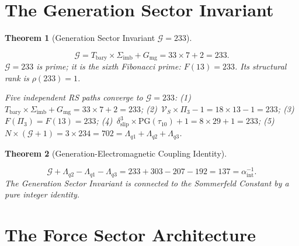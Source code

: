 \documentclass[11pt,letterpaper]{article}
\theoremstyle{plain}
\newtheorem{theorem}{Theorem}[section]
\theoremstyle{definition}
\theoremstyle{remark}
\newcommand{\rank}{\rho}
\newcommand{\Tbary}{T_{\mathrm{bary}}}
\newcommand{\Sigimb}{\Sigma_{\mathrm{imb}}}
\newcommand{\VS}{\mathcal{V}_S}
\newcommand{\PG}{\mathrm{PG}}
\newcommand{\Gmg}{G_{\mathrm{mg}}}
\newcommand{\dslip}{\delta_{\mathrm{slip}}}
\newcommand{\tauX}{\tau_{10}}
\newcommand{\Pithree}{\Pi_3}
\newcommand{\aSC}{\alpha^{-1}_{\mathrm{int}}}
\newcommand{\FibN}[1]{F(#1)}
\begin{document}
\section{The Generation Sector Invariant}\label{sec:gsi}

\begin{theorem}[Generation Sector Invariant
$\mathcal{G}=233$]\label{thm:gsi}
\begin{rsbox}
\[
\mathcal{G}=\Tbary\times\Sigimb+\Gmg=33\times7+2=233.
\]
$\mathcal{G}=233$ is prime; it is the sixth Fibonacci prime:
$\FibN{13}=233$.  Its structural rank is $\rank(233)=1$.

Five independent RS paths converge to $\mathcal{G}=233$:
(1)~$\Tbary\times\Sigimb+\Gmg=33\times7+2=233$;
(2)~$\VS\times\Pithree-1=18\times13-1=233$;
(3)~$\FibN{\Pithree}=\FibN{13}=233$;
(4)~$\dslip^3\times\PG(\tauX)+1=8\times29+1=233$;
(5)~$N\times(\mathcal{G}+1)=3\times234=702=\Lambda_{q1}+\Lambda_{q2}+\Lambda_{q3}$.
\end{rsbox}
\end{theorem}

\begin{theorem}[Generation-Electromagnetic Coupling
Identity]\label{thm:genEM}
\begin{rsbox}
\[
\mathcal{G}+\Lambda_{q2}-\Lambda_{q1}-\Lambda_{q3}
=233+303-207-192=137=\aSC.
\]
The Generation Sector Invariant is connected to the Sommerfeld
Constant by a pure integer identity.
\end{rsbox}
\end{theorem}

\section{The Force Sector Architecture}\label{sec:forces}
\end{document}
